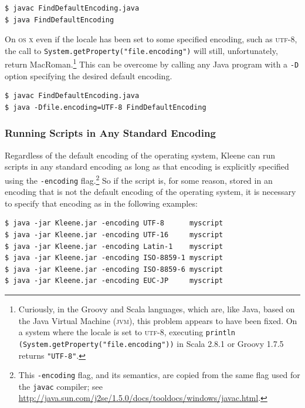 \documentclass[letterpaper,12pt]{article}
\newcommand{\acro}{\textsc}
\begin{document}
\begin{Verbatim}[fontsize=\small]
$ javac FindDefaultEncoding.java
$ java FindDefaultEncoding
\end{Verbatim}

\begin{samepage}
\begin{changebar}

On \acro{os x} even if the locale has been set to some specified
encoding, such as \acro{utf-8}, the call to
\verb!System.getProperty("file.encoding")! will still, unfortunately,
return MacRoman.\footnote{Curiously, in the Groovy and Scala
languages, which are, like Java, based on the Java Virtual Machine
(\acro{jvm}), this problem appears to have been fixed.  On a
system where the locale is set to \acro{utf-8}, executing
\texttt{println (System.getProperty("file.encoding"))} in Scala
2.8.1 or Groovy 1.7.5 returns \verb!"UTF-8"!.}  This can be overcome by calling any Java program with a
\verb!-D! option specifying the desired default
encoding.

\begin{Verbatim}[fontsize=\small]
$ javac FindDefaultEncoding.java
$ java -Dfile.encoding=UTF-8 FindDefaultEncoding
\end{Verbatim}

\end{changebar}
\end{samepage}

\subsubsection{Running Scripts in Any Standard Encoding}

Regardless of the default encoding of the operating system, Kleene can
run scripts in any standard encoding as long as that encoding is
explicitly specified using the \texttt{-encoding} flag.\footnote{This
\texttt{-encoding} flag, and its semantics, are copied from the same flag
used for the \texttt{javac} compiler; see
\url{http://java.sun.com/j2se/1.5.0/docs/tooldocs/windows/javac.html}.}
So if the script is, for some reason, stored in an encoding that is not
the default encoding of the operating system, it is necessary to specify
that encoding as in the following examples: 

\begin{Verbatim}[fontsize=\small]
$ java -jar Kleene.jar -encoding UTF-8      myscript
$ java -jar Kleene.jar -encoding UTF-16     myscript
$ java -jar Kleene.jar -encoding Latin-1    myscript
$ java -jar Kleene.jar -encoding ISO-8859-1 myscript
$ java -jar Kleene.jar -encoding ISO-8859-6 myscript
$ java -jar Kleene.jar -encoding EUC-JP     myscript
\end{Verbatim}
\end{document}
